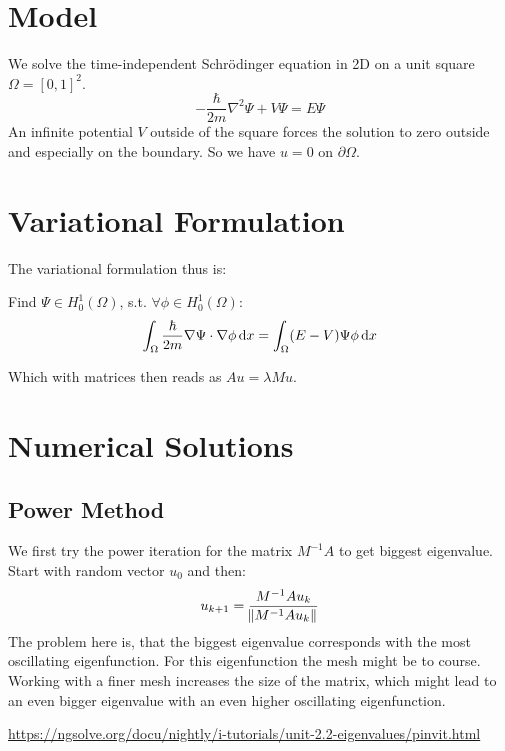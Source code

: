 \documentclass[a4paper,11pt]{scrartcl}
\newcommand*{\dx}{\dif{}x}
\begin{document}
\section*{Model}
We solve the time-independent Schrödinger equation in 2D on a unit square
$\Omega = [0,1]^2$.
\[ -\frac{\hbar}{2m} \nabla^2 \Psi + V \Psi = E \Psi\]
An infinite potential $V$ outside of the square forces the solution to zero
outside and especially on the boundary.
So we have $u = 0$ on $\partial\Omega$.

\section*{Variational Formulation}
The variational formulation thus is:

Find $\Psi \in H^1_0(\Omega)$, s.t. $\forall \phi \in H^1_0(\Omega)$:
\[ \int_{\Omega} \frac{\hbar}{2m} \nabla \Psi \cdot \nabla\phi \dx =
  \int_{\Omega} (E - V) \Psi \phi\dx\]

Which with matrices then reads as $A u = \lambda M u$.

\section*{Numerical Solutions}
\subsection*{Power Method}
We first try the power iteration for the matrix $M^{-1} A$ to get biggest eigenvalue.
Start with random vector $u_0$ and then:
\[ u_{k+1} = \frac{M^{-1} A u_k}{\norm{M^{-1}Au_k}}\]
The problem here is, that the biggest eigenvalue corresponds with the most
oscillating eigenfunction.
For this eigenfunction the mesh might be to course.
Working with a finer mesh increases the size of the matrix, which might lead to
an even bigger eigenvalue with an even higher oscillating eigenfunction.

\url{https://ngsolve.org/docu/nightly/i-tutorials/unit-2.2-eigenvalues/pinvit.html}
\end{document}
